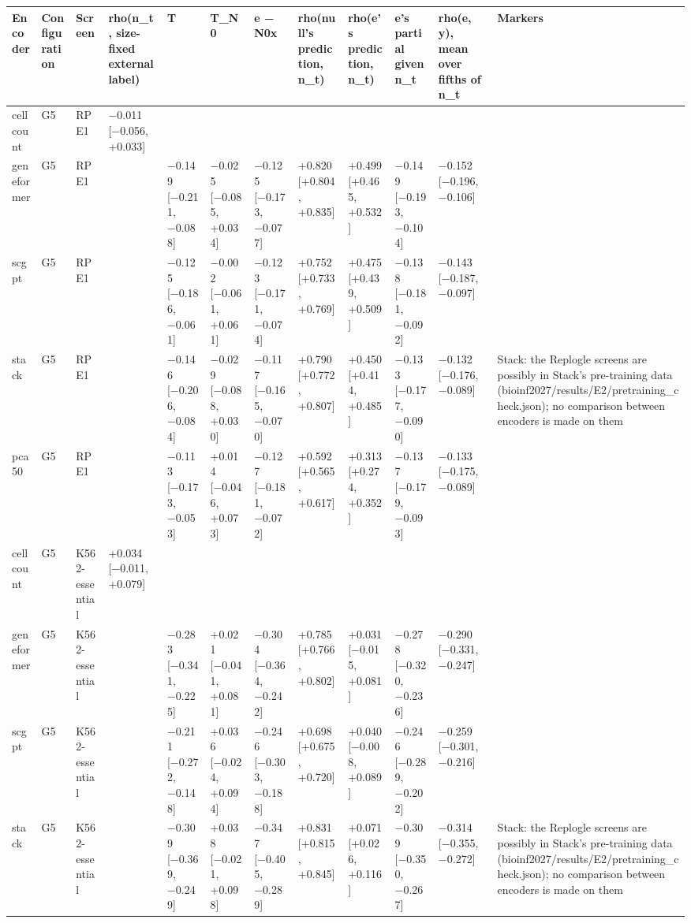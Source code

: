 \begin{tabular}{llllllllllll}
\toprule
Encoder & Configuration & Screen & rho(n\_t, size-fixed external label) & T & T\_N0 & e − N0x & rho(null's prediction, n\_t) & rho(e's prediction, n\_t) & e's partial given n\_t & rho(e, y), mean over fifths of n\_t & Markers \\
\midrule
cell count & G5 & RPE1 & −0.011 [−0.056, +0.033] &  &  &  &  &  &  &  &  \\
geneformer & G5 & RPE1 &  & −0.149 [−0.211, −0.088] & −0.025 [−0.085, +0.034] & −0.125 [−0.173, −0.077] & +0.820 [+0.804, +0.835] & +0.499 [+0.465, +0.532] & −0.149 [−0.193, −0.104] & −0.152 [−0.196, −0.106] &  \\
scgpt & G5 & RPE1 &  & −0.125 [−0.186, −0.061] & −0.002 [−0.061, +0.061] & −0.123 [−0.171, −0.074] & +0.752 [+0.733, +0.769] & +0.475 [+0.439, +0.509] & −0.138 [−0.181, −0.092] & −0.143 [−0.187, −0.097] &  \\
stack & G5 & RPE1 &  & −0.146 [−0.206, −0.084] & −0.029 [−0.088, +0.030] & −0.117 [−0.165, −0.070] & +0.790 [+0.772, +0.807] & +0.450 [+0.414, +0.485] & −0.133 [−0.177, −0.090] & −0.132 [−0.176, −0.089] & Stack: the Replogle screens are possibly in Stack's pre-training data (bioinf2027/results/E2/pretraining\_check.json); no comparison between encoders is made on them \\
pca50 & G5 & RPE1 &  & −0.113 [−0.173, −0.053] & +0.014 [−0.046, +0.073] & −0.127 [−0.181, −0.072] & +0.592 [+0.565, +0.617] & +0.313 [+0.274, +0.352] & −0.137 [−0.179, −0.093] & −0.133 [−0.175, −0.089] &  \\
cell count & G5 & K562-essential & +0.034 [−0.011, +0.079] &  &  &  &  &  &  &  &  \\
geneformer & G5 & K562-essential &  & −0.283 [−0.341, −0.225] & +0.021 [−0.041, +0.081] & −0.304 [−0.364, −0.242] & +0.785 [+0.766, +0.802] & +0.031 [−0.015, +0.081] & −0.278 [−0.320, −0.236] & −0.290 [−0.331, −0.247] &  \\
scgpt & G5 & K562-essential &  & −0.211 [−0.272, −0.148] & +0.036 [−0.024, +0.094] & −0.246 [−0.303, −0.188] & +0.698 [+0.675, +0.720] & +0.040 [−0.008, +0.089] & −0.246 [−0.289, −0.202] & −0.259 [−0.301, −0.216] &  \\
stack & G5 & K562-essential &  & −0.309 [−0.369, −0.249] & +0.038 [−0.021, +0.098] & −0.347 [−0.405, −0.289] & +0.831 [+0.815, +0.845] & +0.071 [+0.026, +0.116] & −0.309 [−0.350, −0.267] & −0.314 [−0.355, −0.272] & Stack: the Replogle screens are possibly in Stack's pre-training data (bioinf2027/results/E2/pretraining\_check.json); no comparison between encoders is made on them \\

\end{tabular}

